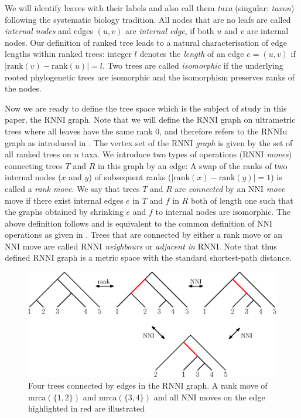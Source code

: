 \documentclass{amsart}
\newcommand{\mrca}{\mathrm{mrca}}
\newcommand{\rank}{\mathrm{rank}}
\newcommand{\nni}{\mathrm{NNI}}
\newcommand{\rnni}{\mathrm{RNNI}}
\newcommand{\rnniu}{\mathrm{RNNIu}}
\begin{document}
We will identify leaves with their labels and also call them \emph{taxa} (singular: \emph{taxon}) following the systematic biology tradition.
All nodes that are no leafs are called \emph{internal nodes} and edges $(u,v)$ are \emph{internal edge}, if both $u$ and $v$ are internal nodes.
Our definition of ranked tree leads to a natural characterisation of edge lengths within ranked trees:
integer $l$ denotes the \emph{length} of an edge $e=(u,v)$ if $|\rank(v) - \rank(u)| = l$.
Two trees are called \emph{isomorphic} if the underlying rooted phylogenetic trees are isomorphic and the isomorphism preserves ranks of the nodes.

Now we are ready to define the tree space which is the subject of study in this paper, the $\rnni$ graph.
Note that we will define the $\rnni$ graph on ultrametric trees where all leaves have the same rank $0$, and therefore refers to the $\rnniu$ graph as introduced in \autocite{Gavryushkin2017}.
The vertex set of the \emph{$\rnni$ graph} is given by the set of all ranked trees on $n$ taxa.
We introduce two types of operations (\emph{$\rnni$ moves}) connecting trees $T$ and $R$ in this graph by an edge:
A swap of the ranks of two internal nodes ($x$ and $y$) of subsequent ranks ($|\rank(x) - \rank(y)| = 1$) is called a \emph{rank move}.
We say that trees $T$ and $R$ are \emph{connected} by an \emph{$\nni$ move} move if there exist internal edges $e$ in $T$ and $f$ in $R$ both of length one such that the graphs obtained by shrinking $e$ and $f$ to internal nodes are isomorphic.
The above definition follows \autocite{Gavryushkin2017} and is equivalent to the common definition of $\nni$ operations as given in \autocite{Steel2016-ye}.
Trees that are connected by either a rank move or an $\nni$ move are called \emph{$\rnni$ neighbours} or \emph{adjacent in} $\rnni$.
Note that thus defined $\rnni$ graph is a metric space with the standard shortest-path distance.

\begin{figure}[H]
	\centering
	\includegraphics[width=\textwidth]{RNNI}
	\caption{Four trees connected by edges in the $\rnni$ graph. A rank move of $\mrca(\{1,2\})$ and $\mrca(\{3,4\})$ and all $\nni$ moves on the edge highlighted in red are illustrated}
	\label{fig:RNNI}
\end{figure}
\end{document}
